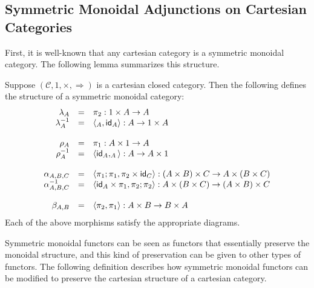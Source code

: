 \documentclass{article}
\let\mto\to
\let\to\rightarrow
\newcommand{\cat}[1]{\mathcal{#1}}
\newcommand{\id}[0]{\mathsf{id}}
\let\t\relax
\newcommand{\t}[0]{\mathsf{t}}
\begin{document}
\subsection{Symmetric Monoidal Adjunctions on Cartesian Categories}
\label{subsec:symmetric_monoidal_adjunctions_on_cartesian_categories}
First, it is well-known that any cartesian category is a symmetric
monoidal category. The following lemma summarizes this structure.
\begin{lemma}
  \label{lemma:CCC-is-SMC}
  Suppose $(\cat{C}, 1, \times, \Rightarrow)$ is a cartesian closed
  category.  Then the following defines the structure of a symmetric
  monoidal category:
  \[
  \begin{array}{rll}
    \lambda_A & = & \pi_2 : 1 \times A \mto A\\
    \lambda^{-1}_A & = & \langle \t_A , \id_A  \rangle : A \mto 1 \times A\\
    \\
    \rho_A & = & \pi_1 : A \times 1 \mto A\\
    \rho^{-1}_A & = & \langle \id_A , \t_A  \rangle : A \mto A \times 1\\
    \\
    \alpha_{A,B,C} & = & \langle \pi_1;\pi_1, \pi_2 \times \id_C \rangle : (A \times B) \times C \mto A \times (B \times C)\\
    \alpha^{-1}_{A,B,C} & = & \langle \id_A \times \pi_1, \pi_2;\pi_2 \rangle : A \times (B \times C) \mto (A \times B) \times C\\
    \\
    \beta_{A,B} & = & \langle \pi_2, \pi_1 \rangle : A \times B \mto B \times A\\
  \end{array}
  \]
  Each of the above morphisms satisfy the appropriate diagrams.
\end{lemma}

Symmetric monoidal functors can be seen as functors that essentially
preserve the monoidal structure, and this kind of preservation can be
given to other types of functors.  The following definition describes
how symmetric monoidal functors can be modified to preserve the
cartesian structure of a cartesian category.
\end{document}
